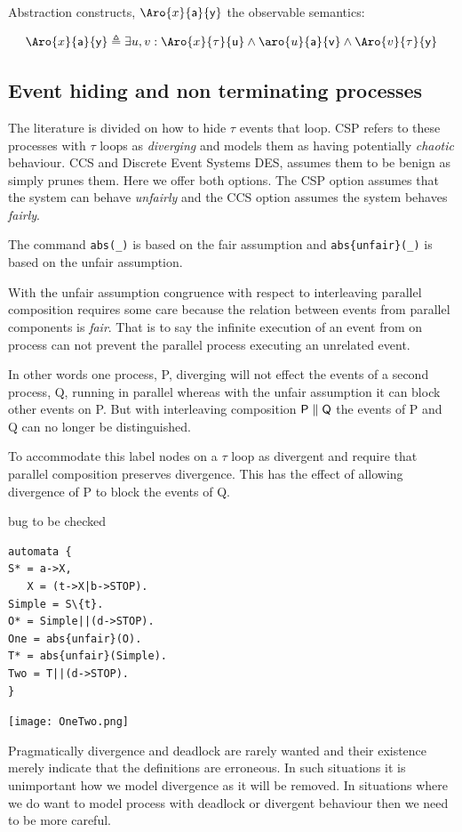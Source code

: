 \documentclass[]{article}
\newcounter{dead1}
\newcounter{dead2}
\begin{document}
 Abstraction constructs, $\Aro{x}{\sf a}{y}$ the observable semantics:


   \[\Aro{x}{\sf a}{y}  \triangleq \exists u,v :   \Aro{x}{\sf \tau}{u} \land  \aro{u}{\sf a}{v}  \land \Aro{v}{\sf \tau}{y}
 \]


 \subsection{Event hiding and non terminating processes }

 The literature is divided on how to hide $\tau$ events that loop.  CSP  refers to these processes with $\tau$ loops  as \emph{diverging} and models them as having potentially \emph{chaotic} behaviour. CCS   and Discrete Event Systems DES, assumes them to be benign as simply prunes them. Here we offer both options. The CSP option assumes that the system can behave \emph{unfairly} and the CCS option assumes the system behaves \emph{fairly}.



 The command \verb|abs(_)| is based on the fair assumption and \verb|abs{unfair}(_)| is based on the unfair assumption.



With the unfair assumption congruence with respect to interleaving parallel composition requires some care because the relation  between events from parallel components is \emph{fair}. That is to say the infinite execution of an event from on process can not prevent the parallel process executing an unrelated event.

In other words one process, {\sf P},  diverging will not effect the events of a second process, {\sf Q},  running in parallel whereas with the unfair assumption it can block other events on {\sf P}. But with interleaving composition ${\sf P\parallel Q}$ the events of {\sf P} and {\sf Q} can no longer be distinguished.

To accommodate this label nodes on a $\tau$ loop as divergent and require that parallel composition preserves divergence. This has the effect of allowing divergence of {\sf P} to block the events of {\sf Q}.

{\color{red} bug to be checked}
\noindent\begin{center}
\begin{minipage}{0.3\textwidth}
\begin{verbatim}
automata {
S* = a->X,
   X = (t->X|b->STOP).
Simple = S\{t}.
O* = Simple||(d->STOP).
One = abs{unfair}(O).
T* = abs{unfair}(Simple).
Two = T||(d->STOP).
}
\end{verbatim}\end{minipage}
\begin{minipage}{0.5\textwidth}
\texttt{[image: OneTwo.png]}
\end{minipage}\end{center}
Pragmatically divergence and deadlock are rarely wanted and their existence merely indicate that the definitions are erroneous. In such situations it is unimportant how we model divergence as it will be removed. In situations where we do want to model process with deadlock  or divergent behaviour then we need to be more careful.
\end{document}
